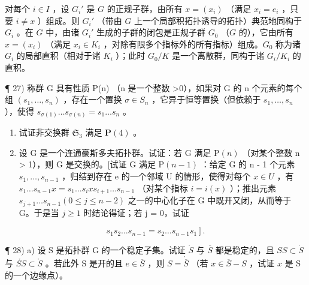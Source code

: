 对每个 \(i \in I\) ，设 \(G_i'\) 是 \(G\) 的正规子群，由所有 \(x = (x_i)\) （满足 \(x_i = e_i\) ，只要 \(i \neq x\) ）组成。则 \(G_i'\) （带由 \(G\) 上一个局部积拓扑诱导的拓扑）典范地同构于 \(G_i\) 。在 \(G\) 中，由诸 \(G_i'\) 生成的子群的闭包是正规子群 \(G_0\) （\(G\) 的），它由所有 \(x = (x_i)\) （满足 \(x_i \in K_i\) ，对除有限多个指标外的所有指标）组成。\(G_0\) 称为诸 \(G_i\) 的局部直积（相对于诸 \(K_i\) ）；此时 \(G_0 / K\) 是一个离散群，同构于诸 \(G_i / K_i\) 的直积。

¶ 27) 称群 G 具有性质 P(n) （n 是一个整数 \textgreater0），如果对 G 的 n 个元素的每个组 \((s_{1}, \ldots, s_{n})\) ，存在一个置换 \(\sigma \in S_{n}\) ，它异于恒等置换（但依赖于 \(s_{1}, \ldots, s_{n}\) ），使得 \(s_{\sigma(1)} \ldots s_{\sigma(n)} = s_{1} \ldots s_{n}\) 。

\begin{enumerate}
\def\labelenumi{\alph{enumi})}
\item
  试证非交换群 \(\mathfrak{S}_3\) 满足 \(\mathbf{P}(4)\) 。
\item
  设 G 是一个连通豪斯多夫拓扑群。试证：若 G 满足 \(\mathrm{P}(n)\) （对某个整数 n \textgreater{} 1），则 G 是交换的。{[}试证 G 满足 \(\mathrm{P}(n - 1)\) ：给定 G 的 n - 1 个元素 \(s_{1}, \ldots, s_{n-1}\) ，归结到存在 e 的一个邻域 U 的情形，使得对每个 \(x \in U\) ，有 \(s_{1} \ldots s_{n-1}x = s_{1} \ldots s_{i}xs_{i+1} \ldots s_{n-1}\) （对某个指标 \(i = i(x)\) ）；推出元素 \(s_{j+1} \ldots s_{n-1} (0 \leqslant j \leqslant n - 2)\) 之一的中心化子在 G 中既开又闭，从而等于 G。于是当 \(j \geqslant 1\) 时结论得证；若 j = 0，试证
\end{enumerate}

\[
\left. s _ {1} s _ {2} \dots s _ {n - 1} = s _ {2} \dots s _ {n - 1} s _ {1} \right].
\]

¶ 28) a) 设 S 是拓扑群 G 的一个稳定子集。试证 \(\mathring{S}\) 与 \(\overline{S}\) 都是稳定的，且 \(SS\subset\mathring{S}\) 与 \(\mathring{SS}\subset\mathring{S}\) 。若此外 S 是开的且 \(e\in\overline{S}\) ，则 \(S=\mathring{\overline{S}}\) （若 \(x\in\overline{S}-S\) ，试证 \(x\) 是 S 的一个边缘点）。

